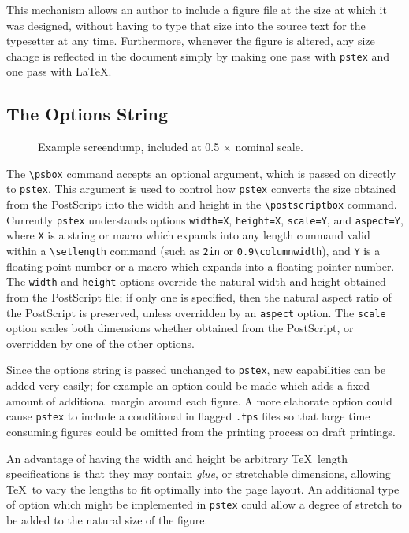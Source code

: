 This mechanism allows an author to include a figure file
at the size at which it was designed,
without having to type that size into the source text
for the typesetter at any time.
Furthermore,
whenever the figure is altered,
any size change is reflected in the document simply
by making one pass with {\tt pstex} and one pass with \LaTeX.

\subsection{The Options String}

\begin{figure*}
  \begin{center}
  \end{center}
  \caption{Example screendump, included at 0.5 $\times$ nominal scale.}
  \label{fig:screen}
\end{figure*}

The \verb|\psbox| command accepts an optional argument,
which is passed on directly to {\tt pstex}.
This argument is used to control how {\tt pstex}
converts the size obtained from the PostScript
into the width and height in the \verb|\postscriptbox| command.
Currently {\tt pstex} understands options
{\tt width=X},
{\tt height=X},
{\tt scale=Y},
and {\tt aspect=Y},
where {\tt X} is a string or macro which expands into any length
command valid
within a \verb|\setlength| command
(such as \verb|2in| or \verb|0.9\columnwidth|),
and {\tt Y} is a floating point number or a macro which expands into
a floating pointer number.
The {\tt width} and {\tt height} options override the
natural width and height obtained from the PostScript file;
if only one is specified,
then the natural aspect ratio of the PostScript is preserved,
unless overridden by an {\tt aspect} option.
The {\tt scale} option scales both dimensions whether obtained
from the PostScript, or overridden by one of the other options.

Since the options string is passed unchanged to {\tt pstex},
new capabilities can be added very easily;
for example an option could be made which adds a fixed amount of
additional margin around each figure.
A more elaborate option could cause {\tt pstex}
to include a conditional in flagged {\tt .tps}
files so that large time consuming figures
could be omitted from the printing process on draft printings.

An advantage of having the width and height be arbitrary
\TeX\ length specifications is that they may contain
{\em glue}, or stretchable dimensions,
allowing \TeX\ to vary the lengths to fit optimally
into the page layout.
An additional type of option which might be implemented in {\tt pstex}
could allow a degree of stretch to be added to the natural
size of the figure.

